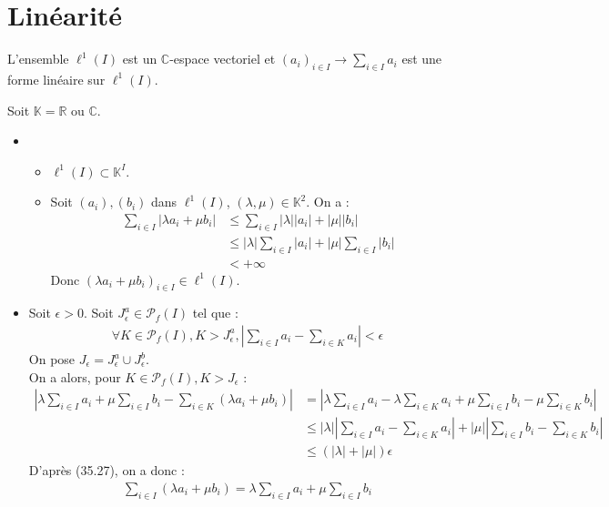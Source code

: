 \documentclass[../main.tex]{subfiles}
\begin{document}
\section{Linéarité}
\begin{tcolorbox}[title=Théorème 35.28, title filled=false, colframe=orange, colback=orange!10!white]
    L'ensemble $\ell^1(I)$ est un $\mathbb{C}$-espace vectoriel et $(a_i)_{i \in I} \to \sum_{i\in I} a_i$ est une forme linéaire sur $\ell^1(I)$. 
\end{tcolorbox}

\noindent Soit $\mathbb{K} = \mathbb{R}$ ou $\mathbb{C}$. 
\begin{itemize}
    \item \begin{itemize}
        \item $\ell^1(I)\subset \mathbb{K}^I$. 
        \item Soit $(a_i), (b_i)$ dans $\ell^1(I)$, $(\lambda, \mu) \in \mathbb{K}^2$. On a : 
        \begin{align*}
            \sum_{i\in I} |\lambda a_i + \mu b_i| &\leq \sum_{i\in I} |\lambda| |a_i| + |\mu| |b_i| \\
            &\leq |\lambda| \sum_{i\in I} |a_i| + |\mu| \sum_{i\in I} |b_i| \\
            &< +\infty
        \end{align*}
        Donc $(\lambda a_i + \mu b_i)_{i \in I} \in \ell^1(I)$.
    \end{itemize}
    \item Soit $\epsilon > 0$. Soit $J_\epsilon^a\in \mathcal{P}_f(I)$ tel que : 
    \begin{align*}
        \forall K\in \mathcal{P}_f(I), K > J_\epsilon^a, \left| \sum_{i\in I} a_i - \sum_{i\in K} a_i \right| < \epsilon
    \end{align*}
    On pose $J_\epsilon = J_\epsilon^a \cup J_\epsilon^b$. \\
    On a alors, pour $K\in \mathcal{P}_f(I), K > J_\epsilon$ :
    \begin{align*}
        \left| \lambda\sum_{i\in I} a_i + \mu\sum_{i\in I} b_i - \sum_{i\in K} (\lambda a_i + \mu b_i) \right| &= \left| \lambda \sum_{i\in I} a_i - \lambda \sum_{i\in K} a_i + \mu\sum_{i\in I} b_i - \mu\sum_{i\in K} b_i \right| \\
        &\leq |\lambda| \left| \sum_{i\in I} a_i - \sum_{i\in K} a_i \right| + |\mu| \left| \sum_{i\in I} b_i - \sum_{i\in K} b_i \right| \\
        &\leq (|\lambda| + |\mu|) \epsilon
    \end{align*}
    D'après (35.27), on a donc : 
    \begin{align*}
        \sum_{i\in I} (\lambda a_i + \mu b_i) = \lambda\sum_{i\in I} a_i + \mu\sum_{i\in I} b_i
    \end{align*}
\end{itemize}
\end{document}
